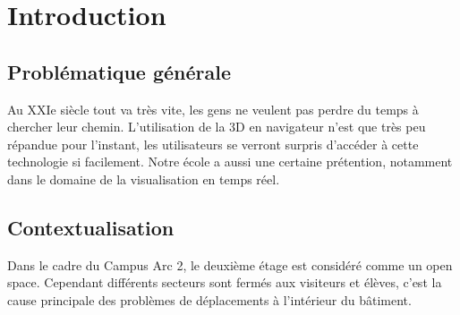 \chapter{Introduction}

\section{Problématique générale}
Au XXIe siècle tout va très vite, les gens ne veulent pas perdre du temps à chercher leur chemin. L'utilisation de la 3D en navigateur n'est que très peu répandue pour l'instant, les utilisateurs se verront surpris d'accéder à cette technologie si facilement. Notre école a aussi une certaine prétention, notamment dans le domaine de la visualisation en temps réel.




\section{Contextualisation}
Dans le cadre du Campus Arc 2, le deuxième étage est considéré comme un open space. Cependant différents secteurs sont fermés aux visiteurs et élèves, c'est la cause principale des problèmes de déplacements à l'intérieur du bâtiment.
